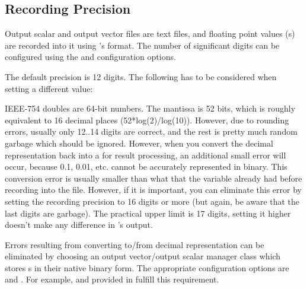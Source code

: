 \subsection{Recording Precision}
\label{sec:ana-sim:outputfile-precision}

Output scalar and output vector files are text files, and floating point
values (s) are recorded into it using 's
 format. The number of significant digits can be configured
using the  and 
configuration options.

The default precision is 12 digits. The following has to be considered when
setting a different value:

IEEE-754 doubles are 64-bit numbers. The mantissa is 52 bits, which is
roughly equivalent to 16 decimal places (52*log(2)/log(10)). However, due
to rounding errors, usually only 12..14 digits are correct, and the rest is
pretty much random garbage which should be ignored. However, when you
convert the decimal representation back into a  for result
processing, an additional small error will occur, because 0.1, 0.01, etc.
cannot be accurately represented in binary. This conversion error is
usually smaller than what that the  variable already had
before recording into the file. However, if it is important, you can
eliminate this error by setting the recording precision to 16 digits or
more (but again, be aware that the last digits are garbage). The practical
upper limit is 17 digits, setting it higher doesn't make any difference in
's output.

%
%
%

Errors resulting from converting to/from decimal representation can be
eliminated by choosing an output vector/output scalar manager class
which stores s in their native binary form.
The appropriate configuration options are 
and . For example,
 and 
provided in  fulfill this requirement.

